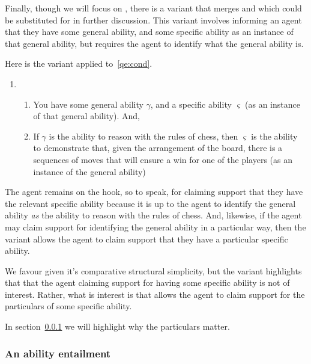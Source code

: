 \begin{note}
  Finally, though we will focus on \gsi{}, there is a variant that merges \gsi{} and \dsi{} which could be substituted for \gsi{} in further discussion.
  This variant involves informing an agent that they have some general ability, and some specific ability as an instance of that general ability, but requires the agent to identify what the general ability is.

  Here is the variant applied to~\ref{qe:cond}.
  \begin{enumerate}[label=(\gsi{}\(^{'}\):\arabic*), ref=(\gsi{}\(^{'}\):\arabic*)]
  \item
    \begin{enumerate}
    \item You have some general ability \(\gamma\), and a specific ability \(\varsigma\) (as an instance of that general ability). And,
    \item If \(\gamma\) is the ability to reason with the rules of chess, then \(\varsigma\) is the ability to demonstrate that, given the arrangement of the board, there is a sequences of moves that will ensure a win for one of the players (as an instance of the general ability)
    \end{enumerate}
  \end{enumerate}
  The agent remains on the hook, so to speak, for claiming support that they have the relevant specific ability because it is up to the agent to identify the general ability \emph{as} the ability to reason with the rules of chess.
  And, likewise, if the agent may claim support for identifying the general ability in a particular way, then the variant allows the agent to claim support that they have a particular specific ability.

  We favour \gsi{} given it's comparative structural simplicity, but the variant highlights that that the agent claiming support for having some specific ability is not of interest.
  Rather, what is interest is that \gsi{} allows the agent to claim support for the particulars of some specific ability.

  In section~\ref{sec:ability-entailment} we will highlight why the particulars matter.
\end{note}

\subsubsection{An ability entailment}
\label{sec:ability-entailment}

